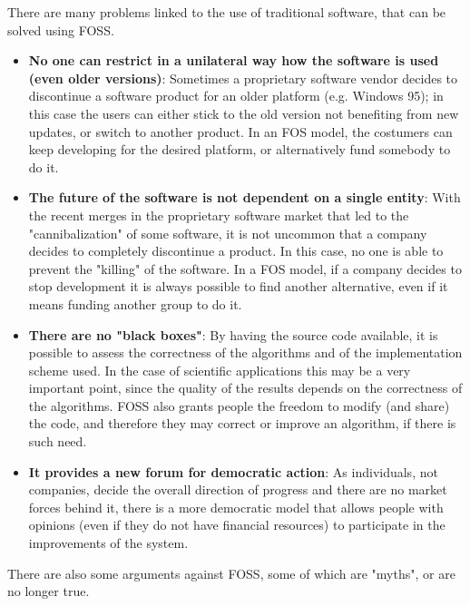 \documentclass[11pt]{article} %
\begin{document}
There are many problems linked to the use of traditional software, that can be solved using FOSS. 
\begin{itemize}
\item \textbf{No one can restrict in a unilateral way how the software is used (even older versions)}: Sometimes a proprietary software vendor decides to discontinue a software product for an older platform (e.g. Windows 95); in this case the users can either stick to the old version not benefiting from new updates, or switch to another product. In an FOS model, the costumers can keep developing for the desired platform, or alternatively fund somebody to do it. %
\item \textbf{The future of the software is not dependent on a single entity}: With the recent merges in the proprietary software market that led to the "cannibalization" of some software, it is not uncommon that a company decides to completely discontinue a product. In this case, no one is able to prevent the "killing" of the software. In a FOS model, if a company decides to stop development it is always possible to find another alternative, even if it means funding another group to do it.
\item \textbf{There are no "black boxes"}: By having the source code available, it is possible to assess the correctness of the algorithms and of the implementation scheme used. In the case of scientific applications this may be a very important point, since the quality of the results depends on the correctness of the algorithms. FOSS also grants people the freedom to modify (and share) the code, and therefore they may correct or improve an algorithm, if there is such need.
\item \textbf{It provides a new forum for democratic action}: As individuals, not companies, decide the overall direction of progress and there are no market forces behind it, there is a more democratic model that allows people with opinions (even if they do not have financial resources) to participate in the improvements of the system.
\end{itemize}
There are also some arguments against FOSS, some of which are "myths", or are no longer true.
\end{document}

